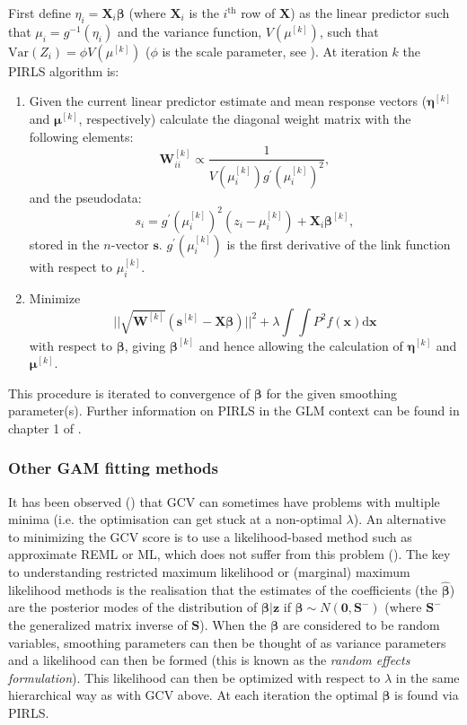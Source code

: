 First define $\eta_i = \mathbf{X}_i\bm{\beta}$ (where $\mathbf{X}_i$ is the $i^\text{th}$ row of $\mathbf{X}$) as the linear predictor such that $\mu_i = g^{-1}(\eta_i)$ and the variance function, $V(\mu^{[k]})$, such that $\text{Var}\left ( Z_i \right ) = \phi V(\mu^{[k]})$ ($\phi$ is the scale parameter, see \cite[p. 62]{simonbook}). At iteration $k$ the PIRLS algorithm is:
\begin{enumerate}
\item Given the current linear predictor estimate and mean response vectors ($\bm{\eta}^{[k]}$ and $\bm{\mu}^{[k]}$, respectively) calculate the diagonal weight matrix with the following elements:
\begin{equation*}
\mathbf{W}^{[k]}_{ii}  \propto \frac{1}{V(\mu_i^{[k]})g^\prime(\mu_i^{[k]})^2},
\end{equation*}
and the pseudodata:
\begin{equation*}
s_i = g^\prime(\mu_i^{[k]})^2(z_i-\mu_i^{[k]}) + \mathbf{X}_i\bm{\beta}^{[k]},
\end{equation*}
stored in the $n$-vector $\mathbf{s}$. $g^\prime(\mu_i^{[k]})$ is the first derivative of the link function with respect to $\mu_i^{[k]}$.
\item Minimize
\begin{equation*}
\lvert \lvert \sqrt{\mathbf{W}^{[k]}} (\mathbf{s}^{[k]} - \mathbf{X}\bm{\beta})  \rvert \rvert^2 + \lambda \int\int P^2 f(\mathbf{x}) \text{d}\mathbf{x}
\end{equation*}
with respect to $\bm{\beta}$, giving $\bm{\beta}^{[k]}$ and hence allowing the calculation of $\bm{\eta}^{[k]}$ and $\bm{\mu}^{[k]}$.
\end{enumerate}
This procedure is iterated to convergence of $\bm{\beta}$ for the given smoothing parameter(s). Further information on PIRLS in the GLM context can be found in chapter 1 of .

\subsubsection{Other GAM fitting methods}

It has been observed (\cite{reissogden}) that GCV can sometimes have problems with multiple minima (i.e. the optimisation can get stuck at a non-optimal $\lambda$). An alternative to minimizing the GCV score is to use a likelihood-based method such as approximate REML or ML, which does not suffer from this problem (\cite{remlpaper}). The key to understanding restricted maximum likelihood or (marginal) maximum likelihood methods is the realisation that the estimates of the coefficients (the $\bm{\hat{\beta}}$) are the posterior modes of the distribution of $\bm{\beta}|\mathbf{z}$ if $\bm{\beta} \sim N(\mathbf{0},\mathbf{S}^-)$ (where $\mathbf{S}^-$ the generalized matrix inverse of $\mathbf{S}$). When the $\bm{\beta}$ are considered to be random variables, smoothing parameters can then be thought of as variance parameters and a likelihood can then be formed (this is known as the \textit{random effects formulation}).  This likelihood can then be optimized with respect to $\lambda$ in the same hierarchical way as with GCV above. At each iteration the optimal $\bm{\beta}$ is found via PIRLS.

